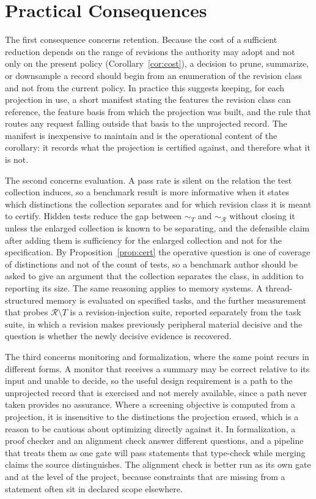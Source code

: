 \documentclass[11pt]{article}
\theoremstyle{remark}
\newcommand{\Rev}{\mathcal{R}}
\begin{document}
\section{Practical Consequences}\label{sec:practical}

The first consequence concerns retention. Because the cost of a sufficient reduction depends on the range of revisions the authority may adopt and not only on the present policy (Corollary~\ref{cor:cost}), a decision to prune, summarize, or downsample a record should begin from an enumeration of the revision class and not from the current policy. In practice this suggests keeping, for each projection in use, a short manifest stating the features the revision class can reference, the feature basis from which the projection was built, and the rule that routes any request falling outside that basis to the unprojected record. The manifest is inexpensive to maintain and is the operational content of the corollary: it records what the projection is certified against, and therefore what it is not.

The second concerns evaluation. A pass rate is silent on the relation the test collection induces, so a benchmark result is more informative when it states which distinctions the collection separates and for which revision class it is meant to certify. Hidden tests reduce the gap between $\sim_T$ and $\sim_{\Rev}$ without closing it unless the enlarged collection is known to be separating, and the defensible claim after adding them is sufficiency for the enlarged collection and not for the specification. By Proposition~\ref{prop:cert} the operative question is one of coverage of distinctions and not of the count of tests, so a benchmark author should be asked to give an argument that the collection separates the class, in addition to reporting its size. The same reasoning applies to memory systems. A thread-structured memory is evaluated on specified tasks, and the further measurement that probes $\Rev\setminus T$ is a revision-injection suite, reported separately from the task suite, in which a revision makes previously peripheral material decisive and the question is whether the newly decisive evidence is recovered.

The third concerns monitoring and formalization, where the same point recurs in different forms. A monitor that receives a summary may be correct relative to its input and unable to decide, so the useful design requirement is a path to the unprojected record that is exercised and not merely available, since a path never taken provides no assurance. Where a screening objective is computed from a projection, it is insensitive to the distinctions the projection erased, which is a reason to be cautious about optimizing directly against it. In formalization, a proof checker and an alignment check answer different questions, and a pipeline that treats them as one gate will pass statements that type-check while merging claims the source distinguishes. The alignment check is better run as its own gate and at the level of the project, because constraints that are missing from a statement often sit in declared scope elsewhere.
\end{document}
